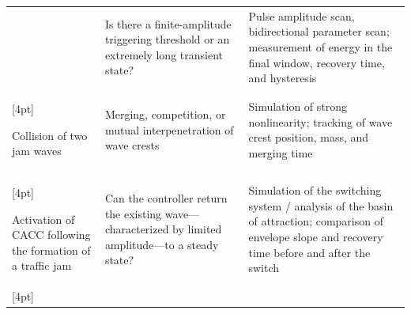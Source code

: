 \documentclass[11pt,a4paper,openany]{book}
\numberwithin{equation}{chapter}
\numberwithin{figure}{chapter}
\numberwithin{table}{chapter}
\begin{document}
\begin{center}
\begin{tabular}{p{3.5cm}p{4.7cm}p{5.5cm}}
&






Is there a finite-amplitude triggering threshold or an extremely long transient state?






&






Pulse amplitude scan, bidirectional parameter scan; measurement of energy in the final window, recovery time, and hysteresis






\\

[4pt]

Collision of two jam waves






&






Merging, competition, or mutual interpenetration of wave crests






&






Simulation of strong nonlinearity; tracking of wave crest position, mass, and merging time
\\

[4pt]

Activation of CACC following the formation of a traffic jam






&Can the controller return the existing wave—characterized by limited amplitude—to a steady state?






&






Simulation of the switching system / analysis of the basin of attraction; comparison of envelope slope and recovery time before and after the switch





\\

[4pt]


\end{tabular}
\end{center}
\end{document}
